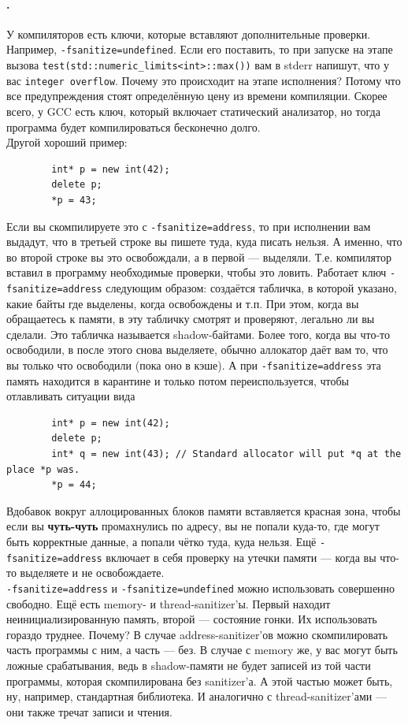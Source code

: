 \documentclass{article}
\begin{document}
    \paragraph{.}
    У компиляторов есть ключи, которые вставляют дополнительные проверки. Например, \texttt{-fsanitize=undefined}. Если его поставить, то при запуске на этапе вызова \texttt{test(std::numeric_limits<int>::max())} вам в stderr напишут, что у вас \texttt{integer overflow}. Почему это происходит на этапе исполнения? Потому что все предупреждения стоят определённую цену из времени компиляции. Скорее всего, у GCC есть ключ, который включает статический анализатор, но тогда программа будет компилироваться бесконечно долго.\\
    Другой хороший пример:
    \begin{verbatim}
        int* p = new int(42);
        delete p;
        *p = 43;
    \end{verbatim}
    Если вы скомпилируете это с \texttt{-fsanitize=address}, то при исполнении вам выдадут, что в третьей строке вы пишете туда, куда писать нельзя. А именно, что во второй строке вы это освобождали, а в первой --- выделяли. Т.е. компилятор вставил в программу необходимые проверки, чтобы это ловить. Работает ключ \texttt{-fsanitize=address} следующим образом: создаётся табличка, в которой указано, какие байты где выделены, когда освобождены и т.п. При этом, когда вы обращаетесь к памяти, в эту табличку смотрят и проверяют, легально ли вы сделали. Это табличка называется shadow-байтами. Более того, когда вы что-то освободили, в после этого снова выделяете, обычно аллокатор даёт вам то, что вы только что освободили (пока оно в кэше). А при \texttt{-fsanitize=address} эта память находится в карантине и только потом переиспользуется, чтобы отлавливать ситуации вида
    \begin{verbatim}
        int* p = new int(42);
        delete p;
        int* q = new int(43); // Standard allocator will put *q at the place *p was.
        *p = 44;
    \end{verbatim}
    Вдобавок вокруг аллоцированных блоков памяти вставляется красная зона, чтобы если вы \textbf{чуть-чуть} промахнулись по адресу, вы не попали куда-то, где могут быть корректные данные, а попали чётко туда, куда нельзя. Ещё \texttt{-fsanitize=address} включает в себя проверку на утечки памяти --- когда вы что-то выделяете и не освобождаете.\\
    \texttt{-fsanitize=address} и \texttt{-fsanitize=undefined} можно использовать совершенно свободно. Ещё есть memory- и thread-sanitizer'ы. Первый находит неинициализированную память, второй --- состояние гонки. Их использовать гораздо труднее. Почему? В случае address-sanitizer'ов можно скомпилировать часть программы с ним, а часть --- без. В случае с memory же, у вас могут быть ложные срабатывания, ведь в shadow-памяти не будет записей из той части программы, которая скомпилирована без sanitizer'а. А этой частью может быть, ну, например, стандартная библиотека. И аналогично с thread-sanitizer'ами --- они также тречат записи и чтения.
\end{document}
